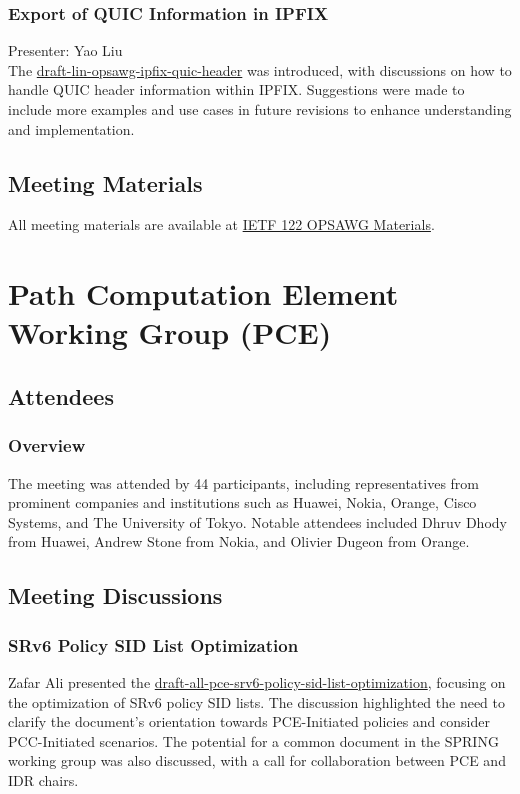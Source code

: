 \documentclass{article}
\begin{document}
\subsubsection{Export of QUIC Information in IPFIX}
Presenter: Yao Liu \\
The \href{https://datatracker.ietf.org/doc/html/draft-lin-opsawg-ipfix-quic-header}{draft-lin-opsawg-ipfix-quic-header} was introduced, with discussions on how to handle QUIC header information within IPFIX. Suggestions were made to include more examples and use cases in future revisions to enhance understanding and implementation.

\subsection{Meeting Materials}
All meeting materials are available at \href{https://datatracker.ietf.org/meeting/122/materials/agenda-122-opsawg}{IETF 122 OPSAWG Materials}.




\newpage

\section{Path Computation Element Working Group (PCE)}

\subsection{Attendees}
\subsubsection{Overview}
The meeting was attended by 44 participants, including representatives from prominent companies and institutions such as Huawei, Nokia, Orange, Cisco Systems, and The University of Tokyo. Notable attendees included Dhruv Dhody from Huawei, Andrew Stone from Nokia, and Olivier Dugeon from Orange.

\subsection{Meeting Discussions}

\subsubsection{SRv6 Policy SID List Optimization}
Zafar Ali presented the \href{https://datatracker.ietf.org/doc/draft-all-pce-srv6-policy-sid-list-optimization/}{draft-all-pce-srv6-policy-sid-list-optimization}, focusing on the optimization of SRv6 policy SID lists. The discussion highlighted the need to clarify the document's orientation towards PCE-Initiated policies and consider PCC-Initiated scenarios. The potential for a common document in the SPRING working group was also discussed, with a call for collaboration between PCE and IDR chairs.
\end{document}
